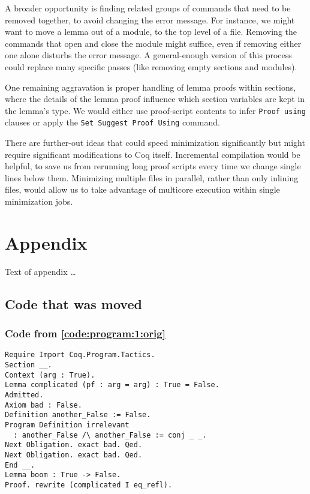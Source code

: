 \documentclass[a4paper,USenglish,cleveref,autoref,thm-restate]{lipics-v2021}
\begin{document}
A broader opportunity is finding related groups of commands that need to be removed together, to avoid changing the error message.
For instance, we might want to move a lemma out of a module, to the top level of a file.
Removing the commands that open and close the module might suffice, even if removing either one alone disturbs the error message.
A general-enough version of this process could replace many specific passes (like removing empty sections and modules).

One remaining aggravation is proper handling of lemma proofs within sections, where the details of the lemma proof influence which section variables are kept in the lemma's type.
We would either use proof-script contents to infer \verb|Proof using| clauses or apply the \verb|Set Suggest Proof Using| command.

There are further-out ideas that could speed minimization significantly but might require significant modifications to Coq itself.
Incremental compilation would be helpful, to save us from rerunning long proof scripts every time we change single lines below them.
Minimizing multiple files in parallel, rather than only inlining files, would allow us to take advantage of multicore execution within single minimization jobs.


\nocite{coqpl-15-coq-bug-minimizer}



\appendix
\section{Appendix}

Text of appendix \ldots

\subsection{Code that was moved}

\subsubsection{Code from \autoref{code:program:1:orig}}\label{code:program:1}
\begin{verbatim}
Require Import Coq.Program.Tactics.
Section __.
Context (arg : True).
Lemma complicated (pf : arg = arg) : True = False.
Admitted.
Axiom bad : False.
Definition another_False := False.
Program Definition irrelevant
  : another_False /\ another_False := conj _ _.
Next Obligation. exact bad. Qed.
Next Obligation. exact bad. Qed.
End __.
Lemma boom : True -> False.
Proof. rewrite (complicated I eq_refl).
\end{verbatim}
\end{document}

